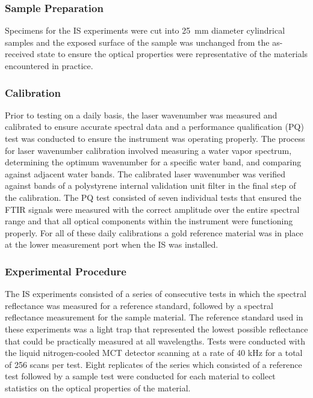 \documentclass[12pt,oneside]{book}
\begin{document}
\subsubsection{Sample Preparation}

Specimens for the IS experiments were cut into 25~mm diameter cylindrical samples and the exposed surface of the sample was unchanged from the as-received state to ensure the optical properties were representative of the materials encountered in practice. 

\subsubsection{Calibration}

Prior to testing on a daily basis, the laser wavenumber was measured and calibrated to ensure accurate spectral data and a performance qualification (PQ) test was conducted to ensure the instrument was operating properly. The process for laser wavenumber calibration involved measuring a water vapor spectrum, determining the optimum wavenumber for a specific water band, and comparing against adjacent water bands. The calibrated laser wavenumber was verified against bands of a polystyrene internal validation unit filter in the final step of the calibration. The PQ test consisted of seven individual tests that ensured the FTIR signals were measured with the correct amplitude over the entire spectral range and that all optical components within the instrument were functioning properly. For all of these daily calibrations a gold reference material was in place at the lower measurement port when the IS was installed.

\subsubsection{Experimental Procedure}

The IS experiments consisted of a series of consecutive tests in which the spectral reflectance was measured for a reference standard, followed by a spectral reflectance measurement for the sample material. The reference standard used in these experiments was a light trap that represented the lowest possible reflectance that could be practically measured at all wavelengths. Tests were conducted with the liquid nitrogen-cooled MCT detector scanning at a rate of 40 kHz for a total of 256 scans per test. Eight replicates of the series which consisted of a reference test followed by a sample test were conducted for each material to collect statistics on the optical properties of the material.
\end{document}

